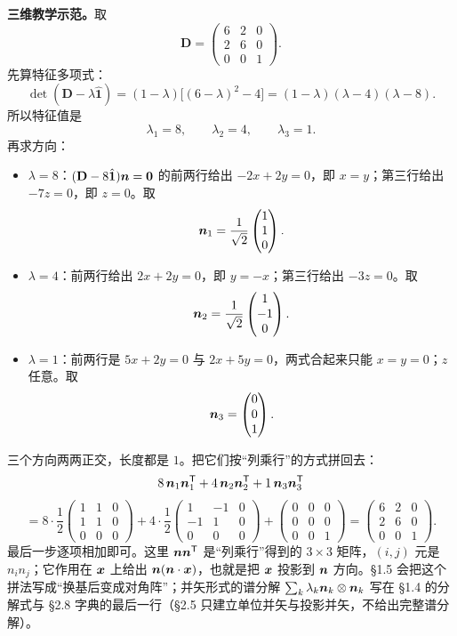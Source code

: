 \documentclass[11pt]{ctexart}
\newcommand{\ten}[1]{\mathbf{#1}}
\newcommand{\unitd}{\hat{\ten{1}}}
\begin{document}
\textbf{三维教学示范。}取
\[
\ten D=\begin{pmatrix}6&2&0\\2&6&0\\0&0&1\end{pmatrix}.
\]
先算特征多项式：
\[
\det(\ten D-\lambda\unitd)
=(1-\lambda)\bigl[(6-\lambda)^2-4\bigr]
=(1-\lambda)(\lambda-4)(\lambda-8).
\]
所以特征值是
\[
\lambda_1=8,\qquad \lambda_2=4,\qquad \lambda_3=1.
\]
再求方向：
\begin{itemize}[leftmargin=1.8em,itemsep=2pt]
\item $\lambda=8$：$(\ten D-8\unitd)\vect n=\vect0$ 的前两行给出 $-2x+2y=0$，即 $x=y$；第三行给出 $-7z=0$，即 $z=0$。取
\[
\boldsymbol{n}_1=\frac{1}{\sqrt2}\begin{pmatrix}1\\1\\0\end{pmatrix}.
\]
\item $\lambda=4$：前两行给出 $2x+2y=0$，即 $y=-x$；第三行给出 $-3z=0$。取
\[
\boldsymbol{n}_2=\frac{1}{\sqrt2}\begin{pmatrix}1\\-1\\0\end{pmatrix}.
\]
\item $\lambda=1$：前两行是 $5x+2y=0$ 与 $2x+5y=0$，两式合起来只能 $x=y=0$；$z$ 任意。取
\[
\boldsymbol{n}_3=\begin{pmatrix}0\\0\\1\end{pmatrix}.
\]
\end{itemize}
三个方向两两正交，长度都是 $1$。把它们按“列乘行”的方式拼回去：
\[
8\,\boldsymbol{n}_1\boldsymbol{n}_1^{\mathsf T}
+4\,\boldsymbol{n}_2\boldsymbol{n}_2^{\mathsf T}
+1\,\boldsymbol{n}_3\boldsymbol{n}_3^{\mathsf T}
\]
\[
=8\cdot\frac12\begin{pmatrix}1&1&0\\1&1&0\\0&0&0\end{pmatrix}
+4\cdot\frac12\begin{pmatrix}1&-1&0\\-1&1&0\\0&0&0\end{pmatrix}
+\begin{pmatrix}0&0&0\\0&0&0\\0&0&1\end{pmatrix}
=\begin{pmatrix}6&2&0\\2&6&0\\0&0&1\end{pmatrix}.
\]
最后一步逐项相加即可。这里 $\boldsymbol{n}\boldsymbol{n}^{\mathsf T}$ 是“列乘行”得到的 $3\times3$ 矩阵，$(i,j)$ 元是 $n_in_j$；它作用在 $\boldsymbol{x}$ 上给出 $\boldsymbol{n}(\boldsymbol{n}\cdot\boldsymbol{x})$，也就是把 $\boldsymbol{x}$ 投影到 $\boldsymbol{n}$ 方向。\S1.5 会把这个拼法写成“换基后变成对角阵”；并矢形式的谱分解 $\sum_k\lambda_k\boldsymbol{n}_k\otimes\boldsymbol{n}_k$ 写在 \S1.4 的分解式与 \S2.8 字典的最后一行（\S2.5 只建立单位并矢与投影并矢，不给出完整谱分解）。
\end{document}
